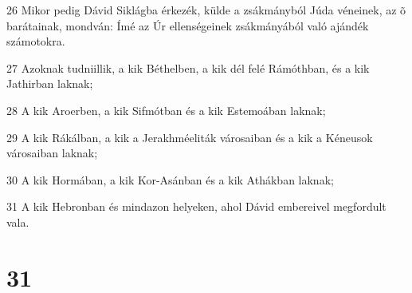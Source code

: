 \par 26 Mikor pedig Dávid Siklágba érkezék, külde a zsákmányból Júda véneinek, az õ barátainak, mondván: Ímé az Úr ellenségeinek zsákmányából való ajándék számotokra.
\par 27 Azoknak tudniillik, a kik Béthelben, a kik dél felé Rámóthban, és a kik Jathirban laknak;
\par 28 A kik Aroerben, a kik Sifmótban és a kik Estemoában laknak;
\par 29 A kik Rákálban, a kik a Jerakhméeliták városaiban és a kik a Kéneusok városaiban laknak;
\par 30 A kik Hormában, a kik Kor-Asánban és a kik Athákban laknak;
\par 31 A kik Hebronban és mindazon helyeken, ahol Dávid embereivel megfordult vala.

\chapter{31}

